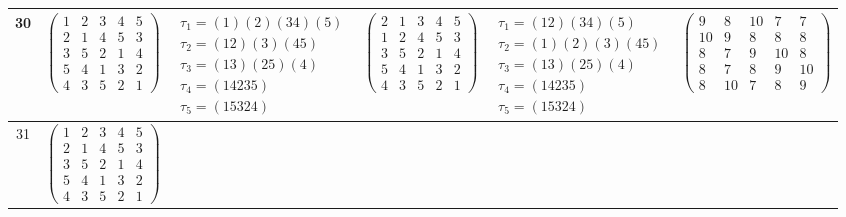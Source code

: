 \begin{longtable}{|c|p{2.7cm}|p{2.7cm}|p{2.7cm}|p{2.7cm}|p{3.3cm}|}
    \hline
    30                                                                                                                                          &
    $\begin{pmatrix}1&2&3&4&5\\2&1&4&5&3\\3&5&2&1&4\\5&4&1&3&2\\4&3&5&2&1\end{pmatrix}$                                                         &
    $\begin{array}{l}\tau_{1}=(1)(2)(34)(5)\\ \tau_{2}=(12)(3)(45)\\ \tau_{3}=(13)(25)(4)\\ \tau_{4}=(14235)\\ \tau_{5}=(15324)\end{array}$     &
    $\begin{pmatrix}2&1&3&4&5\\1&2&4&5&3\\3&5&2&1&4\\5&4&1&3&2\\4&3&5&2&1\end{pmatrix}$                                                         &
    $\begin{array}{l}\tau_{1}=(12)(34)(5)\\ \tau_{2}=(1)(2)(3)(45)\\ \tau_{3}=(13)(25)(4)\\ \tau_{4}=(14235)\\ \tau_{5}=(15324)\end{array}$     &
    $\begin{pmatrix}9&8&10&7&7\\10&9&8&8&8\\8&7&9&10&8\\8&7&8&9&10\\8&10&7&8&9\end{pmatrix}$                                                                                                                                \\
    \hline
    31                                                                                                                                          &
    $\begin{pmatrix}1&2&3&4&5\\2&1&4&5&3\\3&5&2&1&4\\5&4&1&3&2\\4&3&5&2&1\end{pmatrix}$                                                         &

\end{longtable}
